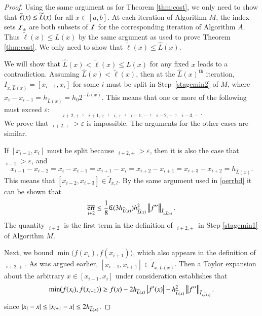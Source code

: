 \documentclass[review]{elsarticle}
\newcommand{\abstol}{\varepsilon}
\theoremstyle{definition}
\newcommand{\tell}{\tilde{\ell}}
\newcommand{\chL}{\widehat{L}}
\DeclareMathOperator{\oerr}{\overline{err}}
\DeclareMathOperator{\herr}{\widehat{err}}
\begin{document}
\begin{proof}

Using the same argument as for Theorem \ref{thm:cost}, we only need to show that
$\tell(x) \le \tL(x)$ for all $x \in [a,b]$.  At each iteration of Algorithm $M$, the index sets
$\mathcal{I}_{\pm}$ are both subsets of $\mathcal{I}$ for the corresponding iteration of Algorithm $A$.
Thus $\tell(x)
\le L(x)$ by the same argument as used to prove Theorem \ref{thm:cost}.  We
only need to show that $\tell(x) \le \chL(x)$.
	
We will show that $\chL(x) < \tell(x) \le L(x)$ for any fixed $x$  leads to a contradiction.
Assuming $\chL(x) < \tell(x)$, then at the $\chL(x)^{\text{th}}$  iteration,
$I_{x,\chL(x)} = [x_{i-1},x_i]$ for some $i$ must be split in Step~\ref{stagemin2} of $M$,
where $x_i-x_{i-1}= h_{\chL(x)} = h_0 2^{-\chL(x)}$.  This means that one or more of the
following must exceed $\abstol$:
\[
\herr_{i+2,+} , \ \herr_{i+1,+}, \ \herr_{i,+}, \  \herr_{i-1,-}, \ \herr_{i-2,-}, \ \herr_{i-3,-}.
\]
We prove that $\herr_{i+2,+} > \abstol$ is impossible.  The arguments for the other cases
are similar.

If $[x_{i-1},x_i]$ must be split because $\herr_{i+2,+} > \abstol$, then it is also the case
that $\oerr_{i-1} > \abstol$, and
\[
x_{i-1} - x_{i-2} = x_i - x_{i-1} = x_{i+1} - x_i = x_{i+2} - x_{i+1}  = x_{i+3} - x_{i+2}
= h_{\chL(x)}.
\]
This means that $[x_{i-2},x_{i+3}] \in \tilde{I}_{x,l}$. By the same argument used in
\eqref{oerrbd} it can be shown that
\begin{equation}
\oerr_{i+2} \le \frac{1}{8} \fC(3 h_{\chL(x)}) h_{\chL(x)}^2 \norm[\tilde{I}_{x,\chL(x)}]{f''}.
\label{oerrupbd}
\end{equation}
The quantity $\oerr_{i+2}$ is the first term in the definition of $\herr_{i+2,+}$ in Step
\ref{stagemin1} of Algorithm $M$.

Next, we bound $\min\bigl(f(x_{i}),f(x_{i+1}) \bigr)$, which also appears in the
definition of $\herr_{i+2,+}$. As was argued earlier, $[x_{i-1},x_{i+1}] \in
\tilde{I}_{x,\chL(x)}$. Then a Taylor expansion about the arbitrary $x \in [x_{i-1},x_{i}] $
under consideration establishes that
\begin{equation} \label{minfjjm1bd}
\min\bigl(f(x_{i}),f(x_{i+1}) \bigr)
\ge f(x) - 2h_{\chL(x)}\abs{f'(x)} - h_{\chL(x)}^2 \norm[\bar{I}_{x,\chL(x)}]{f''} .
\end{equation}
since $\abs{x_i - x} \le \abs{x_{i+1} - x} \le 2h_{\chL(x)}$.


\end{proof}
\end{document}
